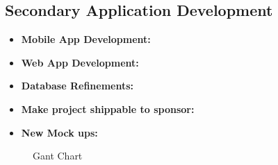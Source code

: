 \documentclass[Letter,11pt]{article}
\begin{document}
	\subsection{Secondary Application Development}\label{dev2}
		
		\begin{itemize}
			\item\textbf{Mobile App Development:}\\
			
			\item \textbf{Web App Development:}\\
			
			
			\item\textbf{Database Refinements:}\\
			
			\item\textbf{Make project shippable to sponsor:}\\
			
			\item\textbf{New Mock ups:}\\
			
		\end{itemize}
		
		\begin{landscape}
			\begin{figure}
				
				\caption{\label{fig:gant}Gant Chart}
			\end{figure}
		\end{landscape}
	
\end{document}
